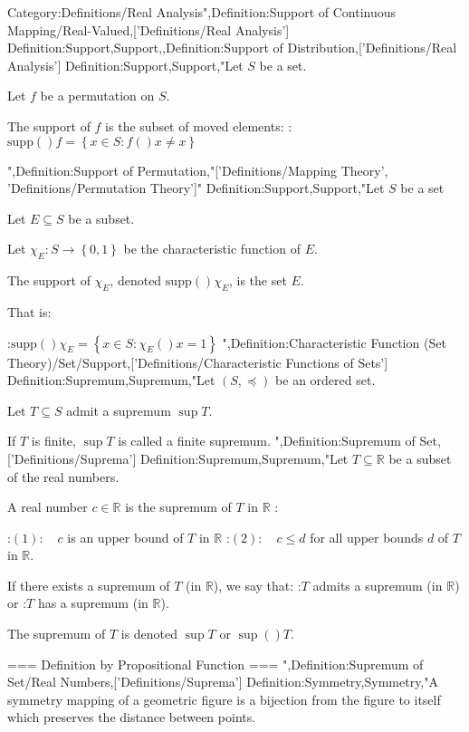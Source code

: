 Category:Definitions/Real Analysis",Definition:Support of Continuous Mapping/Real-Valued,['Definitions/Real Analysis']
Definition:Support,Support,,Definition:Support of Distribution,['Definitions/Real Analysis']
Definition:Support,Support,"Let $S$ be a set.

Let $f$ be a permutation on $S$.


The support of $f$ is the subset of moved elements:
:$\mathrm {supp} \left(   \right)f = \left\lbrace x \in S: f \left(   \right)x \ne x \right\rbrace$



",Definition:Support of Permutation,"['Definitions/Mapping Theory', 'Definitions/Permutation Theory']"
Definition:Support,Support,"Let $S$ be a set

Let $E \subseteq S$ be a subset.

Let $\chi_E: S \to \left\lbrace 0, 1 \right\rbrace$ be the characteristic function of $E$.


The support of $\chi_E$, denoted $\mathrm {supp} \left(   \right){\chi_E}$, is the set $E$.

That is:

:$\mathrm {supp} \left(   \right){\chi_E} = \left\lbrace x \in S: \chi_E \left(   \right)x = 1 \right\rbrace$
",Definition:Characteristic Function (Set Theory)/Set/Support,['Definitions/Characteristic Functions of Sets']
Definition:Supremum,Supremum,"Let $\left( S, \preccurlyeq \right)$ be an ordered set.

Let $T \subseteq S$ admit a supremum $\sup T$.


If $T$ is finite, $\sup T$ is called a finite supremum.
",Definition:Supremum of Set,['Definitions/Suprema']
Definition:Supremum,Supremum,"Let $T \subseteq \mathbb R$ be a subset of the real numbers.


A real number $c \in \mathbb R$ is the supremum of $T$ in $\mathbb R$ :

:$(1): \quad c$ is an upper bound of $T$ in $\mathbb R$
:$(2): \quad c \le d$ for all upper bounds $d$ of $T$ in $\mathbb R$.


If there exists a supremum of $T$ (in $\mathbb R$), we say that:
:$T$ admits a supremum (in $\mathbb R$) or
:$T$ has a supremum (in $\mathbb R$).


The supremum of $T$ is denoted $\sup T$ or $\sup \left(   \right)T$.


=== Definition by Propositional Function ===
",Definition:Supremum of Set/Real Numbers,['Definitions/Suprema']
Definition:Symmetry,Symmetry,"A symmetry mapping of a geometric figure is a bijection from the figure to itself which preserves the distance between points.

